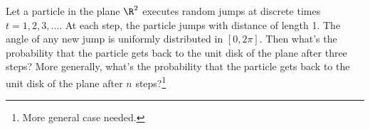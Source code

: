 
\begin{problem}
Let a particle in the plane $\R^2$ executes random jumps at discrete times $t=1,2,3,\dots$. At each step, the particle jumps with distance of length 1. The angle of any new jump is uniformly distributed in $[0,2\pi]$. Then what's the probability that the particle gets back to the unit disk of the plane after three steps? More generally, what's the probability that the particle gets back to the unit disk of the plane after $n$ steps?\footnote{More general case needed.}
\end{problem}



